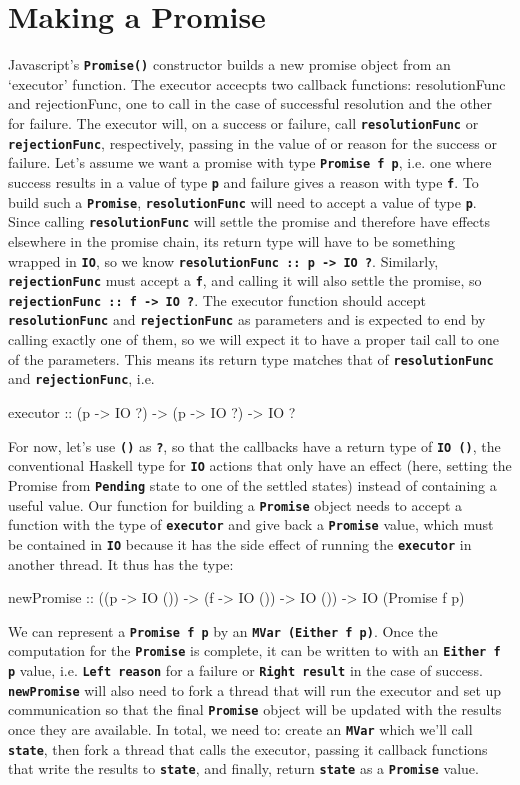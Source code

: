 \documentclass[12pt, english, letterpaper]{kuthesis}
\newcommand{\lit}[1]{\textbf{\texttt{#1}}}
\begin{document}
\section*{Making a Promise}
Javascript's \lit{Promise()} constructor builds a new promise object from an `executor' function.  The executor accecpts two callback functions: resolutionFunc and rejectionFunc, one to call in the case of successful resolution and the other for failure.  The executor will, on a success or failure, call \lit{resolutionFunc} or \lit{rejectionFunc}, respectively, passing in the value of or reason for the success or failure.  Let's assume we want a promise with type \lit{Promise f p}, i.e. one where success results in a value of type \lit p and failure gives a reason with type \lit f.  To build such a \lit{Promise}, \lit{resolutionFunc} will need to accept a value of type \lit p.  Since calling \lit{resolutionFunc} will settle the promise and therefore have effects elsewhere in the promise chain, its return type will have to be something wrapped in \lit{IO}, so we know \lit{resolutionFunc ::\ p -> IO ?}.  Similarly, \lit{rejectionFunc} must accept a \lit f, and calling it will also settle the promise, so \lit{rejectionFunc ::\ f -> IO ?}.  The executor function should accept \lit{resolutionFunc} and \lit{rejectionFunc} as parameters and is expected to end by calling exactly one of them, so we will expect it to have a proper tail call to one of the parameters.  This means its return type matches that of \lit{resolutionFunc} and \lit{rejectionFunc}, i.e.
\begin{code}
executor :: (p -> IO ?) -> (p -> IO ?) -> IO ?
\end{code}
  For now, let's use \lit{()} as \lit ?, so that the callbacks have a return type of \lit{IO ()}, the conventional Haskell type for \lit{IO} actions that only have an effect (here, setting the Promise from \lit{Pending} state to one of the settled states) instead of containing a useful value.  Our function for building a \lit{Promise} object needs to accept a function with the type of \lit{executor} and give back a \lit{Promise} value, which must be contained in \lit{IO} because it has the side effect of running the \lit{executor} in another thread.  It thus has the type:
\begin{code}[xleftmargin=0em]
newPromise :: ((p -> IO ()) -> (f -> IO ()) -> IO ()) -> IO (Promise f p)
\end{code}
We can represent a \lit{Promise f p} by an \lit{MVar (Either f p)}.  Once the computation for the \lit{Promise} is complete, it can be written to with an \lit{Either f p} value, i.e. \lit{Left reason} for a failure or \lit{Right result} in the case of success.  \lit{newPromise} will also need to fork a thread that will run the executor and set up communication so that the final \lit{Promise} object will be updated with the results once they are available.  In total, we need to: create an \lit{MVar} which we'll call \lit{state}, then fork a thread that calls the executor, passing it callback functions that write the results to \lit{state}, and finally, return \lit{state} as a \lit{Promise} value.
\end{document}
